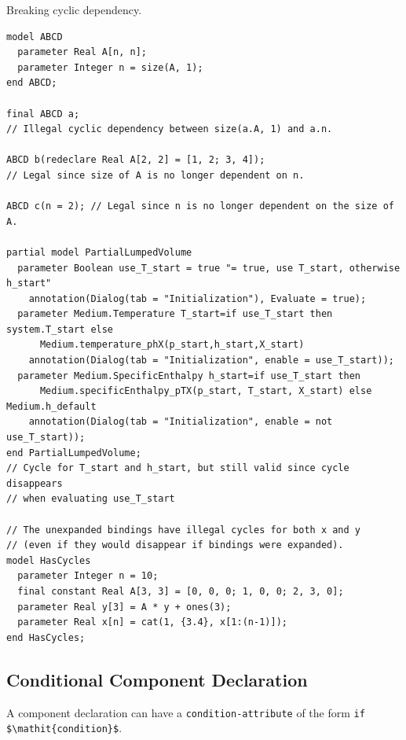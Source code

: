 \begin{example}
Breaking cyclic dependency.
\begin{lstlisting}[language=modelica]
model ABCD
  parameter Real A[n, n];
  parameter Integer n = size(A, 1);
end ABCD;

final ABCD a;
// Illegal cyclic dependency between size(a.A, 1) and a.n.

ABCD b(redeclare Real A[2, 2] = [1, 2; 3, 4]);
// Legal since size of A is no longer dependent on n.

ABCD c(n = 2); // Legal since n is no longer dependent on the size of A.

partial model PartialLumpedVolume
  parameter Boolean use_T_start = true "= true, use T_start, otherwise h_start"
    annotation(Dialog(tab = "Initialization"), Evaluate = true);
  parameter Medium.Temperature T_start=if use_T_start then system.T_start else
      Medium.temperature_phX(p_start,h_start,X_start)
    annotation(Dialog(tab = "Initialization", enable = use_T_start));
  parameter Medium.SpecificEnthalpy h_start=if use_T_start then
      Medium.specificEnthalpy_pTX(p_start, T_start, X_start) else Medium.h_default
    annotation(Dialog(tab = "Initialization", enable = not use_T_start));
end PartialLumpedVolume;
// Cycle for T_start and h_start, but still valid since cycle disappears
// when evaluating use_T_start

// The unexpanded bindings have illegal cycles for both x and y
// (even if they would disappear if bindings were expanded).
model HasCycles
  parameter Integer n = 10;
  final constant Real A[3, 3] = [0, 0, 0; 1, 0, 0; 2, 3, 0];
  parameter Real y[3] = A * y + ones(3);
  parameter Real x[n] = cat(1, {3.4}, x[1:(n-1)]);
end HasCycles;
\end{lstlisting}
\end{example}


\subsection{Conditional Component Declaration}\label{conditional-component-declaration}

A component declaration can have a \lstinline[language=grammar]!condition-attribute! of the form \lstinline!if $\mathit{condition}$!.

